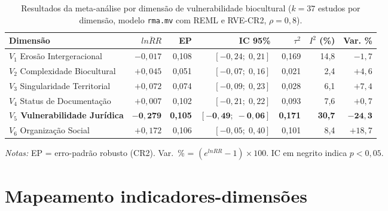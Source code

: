 \documentclass[12pt,a4paper]{article}
\begin{document}
\begin{table}[H]
\caption{Resultados da meta-análise por dimensão de vulnerabilidade biocultural ($k = 37$ estudos por dimensão, modelo \texttt{rma.mv} com REML e RVE-CR2, $\rho = 0{,}8$).}
\label{tab:meta-results}
\centering
\small
\begin{tabular}{lrrrrrr}
\toprule
\textbf{Dimensão} & $\overline{lnRR}$ & \textbf{EP} & \textbf{IC 95\%} & $\tau^2$ & $I^2$ (\%) & \textbf{Var. \%} \\
\midrule
$V_1$ Eros\~ao Intergeracional    & $-0{,}017$ & 0,108 & $[-0{,}24;\; 0{,}21]$ & 0,169 & 14,8 & $-1{,}7$ \\
$V_2$ Complexidade Biocultural    & $+0{,}045$ & 0,051 & $[-0{,}07;\; 0{,}16]$ & 0,021 &  2,4 & $+4{,}6$ \\
$V_3$ Singularidade Territorial   & $+0{,}072$ & 0,074 & $[-0{,}09;\; 0{,}23]$ & 0,028 &  6,1 & $+7{,}4$ \\
$V_4$ Status de Documenta\c{c}\~ao    & $+0{,}007$ & 0,102 & $[-0{,}21;\; 0{,}22]$ & 0,093 &  7,6 & $+0{,}7$ \\
\textbf{$V_5$ Vulnerabilidade Jur\'idica} & $\mathbf{-0{,}279}$ & \textbf{0,105} & $\mathbf{[-0{,}49;\; -0{,}06]}$ & \textbf{0,171} & \textbf{30,7} & $\mathbf{-24{,}3}$ \\
$V_6$ Organiza\c{c}\~ao Social       & $+0{,}172$ & 0,106 & $[-0{,}05;\; 0{,}40]$ & 0,101 &  8,4 & $+18{,}7$ \\
\bottomrule
\end{tabular}
\begin{flushleft}
\footnotesize \textit{Notas:} EP = erro-padrão robusto (CR2). Var.~\% = $(e^{lnRR} - 1) \times 100$.  IC em negrito indica $p < 0{,}05$.
\end{flushleft}
\end{table}

\newpage

\section{Mapeamento indicadores-dimensões}
\label{app:mapping}
\end{document}
